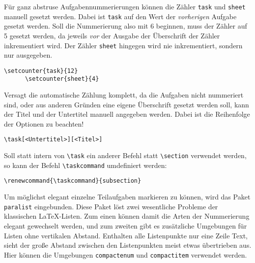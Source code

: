 \documentclass{exercise}
\begin{document}
    Für ganz abstruse Aufgabennummerierungen können die Zähler \lstinline{task} und \lstinline{sheet} manuell gesetzt werden. Dabei ist \lstinline{task} auf den Wert der \emph{vorherigen} Aufgabe gesetzt werden. Soll die Nummerierung also mit 6 beginnen, muss der Zähler auf 5 gesetzt werden, da jeweils \emph{vor} der Ausgabe der Überschrift der Zähler inkrementiert wird. Der Zähler \lstinline{sheet} hingegen wird nie inkrementiert, sondern nur ausgegeben.
    \begin{lstlisting}[gobble=6]
      \setcounter{task}{12}
      \setcounter{sheet}{4}
    \end{lstlisting}

    Versagt die automatische Zählung komplett, da die Aufgaben nicht nummeriert sind, oder aus anderen Gründen eine eigene Überschrift gesetzt werden soll, kann der Titel und der Untertitel manuell angegeben werden. Dabei ist die Reihenfolge der Optionen zu beachten!
    \begin{lstlisting}[gobble=6]
      \task[<Untertitel>][<Titel>]
    \end{lstlisting}

    Soll statt intern von \lstinline-\task- ein anderer Befehl statt \lstinline-\section- verwendet werden, so kann der Befehl \lstinline-\taskcommand- umdefiniert werden:
    \begin{lstlisting}[gobble=6]
      \renewcommand{\taskcommand}{subsection}
    \end{lstlisting}

    Um möglichst elegant einzelne Teilaufgaben markieren zu können, wird das Paket \texttt{paralist} \cite{paralist} eingebunden. Diese Paket löst zwei wesentliche Probleme der klassischen \LaTeX{}-Listen. Zum einen können damit die Arten der Nummerierung elegant gewechselt werden, und zum zweiten gibt es zusätzliche Umgebungen für Listen ohne vertikalen Abstand. Enthalten alle Listenpunkte nur eine Zeile Text, sieht der große Abstand zwischen den Listenpunkten meist etwas übertrieben aus. Hier können die Umgebungen \lstinline{compactenum} und \lstinline{compactitem} verwendet werden.
\end{document}
